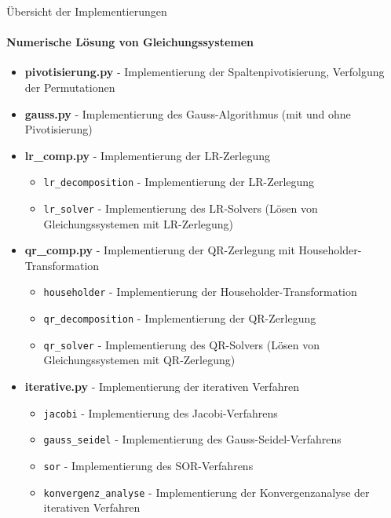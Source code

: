 \begin{KR}{Übersicht der Implementierungen}
\paragraph{Numerische Lösung von Gleichungssystemen}
\begin{itemize}
    \item \textbf{pivotisierung.py} - Implementierung der Spaltenpivotisierung, Verfolgung der Permutationen
    \item \textbf{gauss.py} - Implementierung des Gauss-Algorithmus (mit und ohne Pivotisierung)
    \item \textbf{lr_comp.py} - Implementierung der LR-Zerlegung 
    \begin{itemize}
        \item \texttt{lr_decomposition} - Implementierung der LR-Zerlegung
        \item \texttt{lr_solver} - Implementierung des LR-Solvers (Lösen von Gleichungssystemen mit LR-Zerlegung)
    \end{itemize}
    \item \textbf{qr_comp.py} - Implementierung der QR-Zerlegung mit Householder-Transformation
    \begin{itemize}
        \item \texttt{householder} - Implementierung der Householder-Transformation
        \item \texttt{qr_decomposition} - Implementierung der QR-Zerlegung
        \item \texttt{qr_solver} - Implementierung des QR-Solvers (Lösen von Gleichungssystemen mit QR-Zerlegung)
    \end{itemize}
    \item \textbf{iterative.py} - Implementierung der iterativen Verfahren
    \begin{itemize}
        \item \texttt{jacobi} - Implementierung des Jacobi-Verfahrens
        \item \texttt{gauss_seidel} - Implementierung des Gauss-Seidel-Verfahrens
        \item \texttt{sor} - Implementierung des SOR-Verfahrens
        \item \texttt{konvergenz_analyse} - Implementierung der Konvergenzanalyse der iterativen Verfahren
    \end{itemize}
\end{itemize}


\end{KR}
